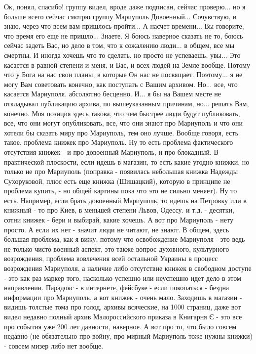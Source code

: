  
 
 
 
 

Ок, понял, спасибо! группу видел, вроде даже подписан, сейчас проверю... но я
больше всего сейчас смотрю группу Мариуполь Довоенный... Сочувствую, и знаю,
через что всем вам пришлось пройти... А насчет времени... Вы говорите, что
время его еще не пришло... Знаете. Я боюсь наверное сказать не то, боюсь сейчас
задеть Вас, но дело в том, что к сожалению люди... в общем, все мы смертны. И
иногда хочешь что то сделать, но просто не успеваешь, увы... Это касается в
равной степени и меня, и Вас, и всех людей на Земле вообще. Потому что у Бога
на нас свои планы, в которые Он нас не посвящает. Поэтому... я не могу Вам
советовать конечно, как поступать с Вашим архивом. Но... все, что касается
Мариуполя. абсолютно бесценно. И... я бы на Вашем месте не откладывал
публикацию архива, по вышеуказанным причинам, но... решать Вам, конечно. Моя
позиция здесь такова, что чем быстрее люди будут публиковать, все, что они
могут опубликовать, все, что они знают про Мариуполь и что они хотели бы
сказать миру про Мариуполь, тем оно лучше. Вообще говоря, есть такое, проблема
книжек про Мариуполь. Ну то есть проблема фактического отсутствия книжек - и
про довоенный Мариуполь, и про блокадный. В практической плоскости, если идешь
в магазин, то есть какие угодно книжки, но только не про Мариуполь (поправка -
появилась небольшая книжка Надежды Сухоруковой, плюс есть еще книжка
(Шишацкий), которую в принципе не проблема купить, - но общей картины пока что
это не сильно меняет). Ну то есть. Например, если брать довоенный Мариуполь, то
идешь на Петровку или в книжный - то про Киев, в меньшей степени Львов, Одессу.
и т.д. - десятки, сотни книжек - бери и выбирай, какие хочешь. А вот про
Мариуполь - нету просто. А если их нет - значит люди не читают, не знают. В
общем, здесь большая проблема, как я вижу, потому что освобождение Мариуполя -
это ведь не только чисто военный аспект, это также вопрос духовного,
культурного возрождения, проблема вовлечения всей остальной Украины в процесс
возрождения Мариуполя, а наличие либо отсутствие книжек в свободном доступе -
это как раз маркер того, насколько успешно или неуспешно идет дело в этом
направлении. Парадокс - в интернете, фейсбуке - если покопаться - бездна
информации про Мариуполь, а вот книжек - очень мало. Заходишь в магазин -
видишь толстые тома про голод, архивы всяческие, на 1000 страниц, даже вот
видел недавно полный архив Малороссийского приказа в Книгарня Є - это все про
события уже 200 лет давности, наверное. А вот про то, что было совсем недавно
(не обязательно про войну, про мирный Мариуполь тоже нужны книжки) - совсем
мизер либо нет вообще.
